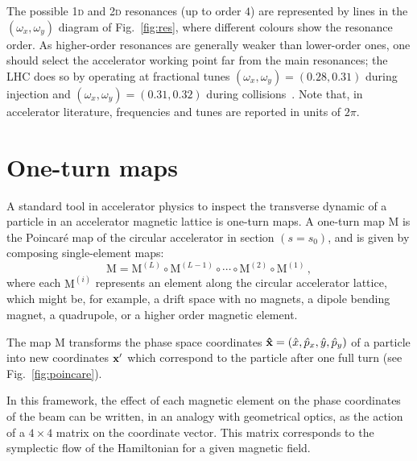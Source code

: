 The possible 1\textsc{d} and 2\textsc{d} resonances (up to order $4$) are represented by lines in the $(\omega_x, \omega_y)$ diagram of Fig.~\ref{fig:res}, where different colours show the resonance order. As higher-order resonances are generally weaker than lower-order ones, one should select the accelerator working point far from the main resonances; the LHC does so by operating at fractional tunes $(\omega_x, \omega_y)=(0.28, 0.31)$ during injection and $(\omega_x, \omega_y)=(0.31, 0.32)$ during collisions~\cite{Benedikt:823808}. Note that, in accelerator literature, frequencies and tunes are reported in units of $2\pi$. 

\section{One-turn maps} \label{sec:acc:oneturn}

A standard tool in accelerator physics to inspect the transverse dynamic of a particle in an accelerator magnetic lattice is one-turn maps. A one-turn map \(\mathrm{M}\) is the Poincaré map of the circular accelerator in section $(s = s_0)$, and is given by composing single-element maps:
\begin{equation}
	\mathrm{M} = \mathrm{M}^{(L)} \circ \mathrm{M}^{(L - 1)} \circ \cdots \circ \mathrm{M}^{(2)} \circ \mathrm{M}^{(1)} \,,
\end{equation}
where each $\mathrm{M}^{(i)}$ represents an element along the circular accelerator lattice, which might be, for example, a drift space with no magnets, a dipole bending magnet, a quadrupole, or a higher order magnetic element. 

The map \(\mathrm{M}\) transforms the phase space coordinates \(\vb{\hat x} = (\hat x, \hat p_x, \hat y, \hat p_y)\) of a particle into new coordinates \(\vb{x}'\) which correspond to the particle after one full turn (see Fig.~\ref{fig:poincare}).

In this framework, the effect of each magnetic element on the phase coordinates of the beam can be written, in an analogy with geometrical optics, as the action of a $4\times4$ matrix on the coordinate vector. This matrix corresponds to the symplectic flow of the Hamiltonian for a given magnetic field.

